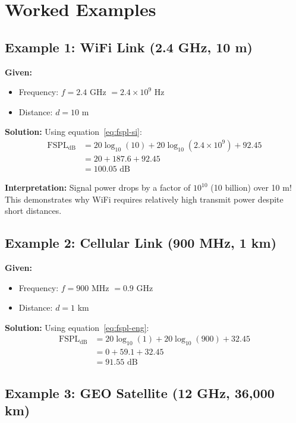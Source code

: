\section{Worked Examples}
\label{sec:examples}

\subsection{Example 1: WiFi Link (2.4 GHz, 10 m)}

\textbf{Given:}
\begin{itemize}
\item Frequency: $f = 2.4$ GHz $= 2.4 \times 10^9$ Hz
\item Distance: $d = 10$ m
\end{itemize}

\textbf{Solution:} Using equation~\eqref{eq:fspl-si}:
\begin{align}
\text{FSPL}_{\text{dB}} &= 20\log_{10}(10) + 20\log_{10}(2.4 \times 10^9) + 92.45 \nonumber \\
&= 20 + 187.6 + 92.45 \nonumber \\
&= 100.05 \text{ dB}
\end{align}

\textbf{Interpretation:} Signal power drops by a factor of $10^{10}$ (10 billion) over 10 m! This demonstrates why WiFi requires relatively high transmit power despite short distances.

\subsection{Example 2: Cellular Link (900 MHz, 1 km)}

\textbf{Given:}
\begin{itemize}
\item Frequency: $f = 900$ MHz $= 0.9$ GHz
\item Distance: $d = 1$ km
\end{itemize}

\textbf{Solution:} Using equation~\eqref{eq:fspl-eng}:
\begin{align}
\text{FSPL}_{\text{dB}} &= 20\log_{10}(1) + 20\log_{10}(900) + 32.45 \nonumber \\
&= 0 + 59.1 + 32.45 \nonumber \\
&= 91.55 \text{ dB}
\end{align}

\subsection{Example 3: GEO Satellite (12 GHz, 36,000 km)}

